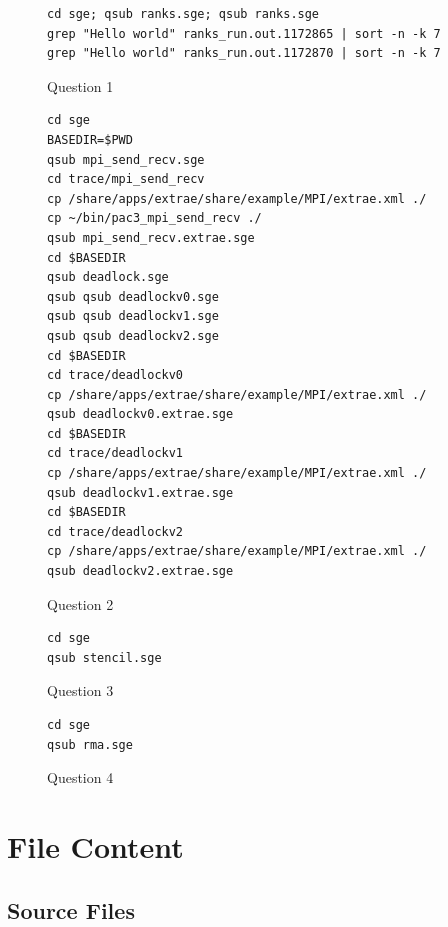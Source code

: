 \documentclass[12pt]{article}
\begin{document}
\newpage

\begin{figure}[h!]
	\begin{verbatim}
cd sge; qsub ranks.sge; qsub ranks.sge
grep "Hello world" ranks_run.out.1172865 | sort -n -k 7
grep "Hello world" ranks_run.out.1172870 | sort -n -k 7
	\end{verbatim}
\caption{Question 1}\label{code:q1}
\end{figure}

\begin{figure}[h!]
	\begin{verbatim}
cd sge
BASEDIR=$PWD
qsub mpi_send_recv.sge
cd trace/mpi_send_recv
cp /share/apps/extrae/share/example/MPI/extrae.xml ./
cp ~/bin/pac3_mpi_send_recv ./
qsub mpi_send_recv.extrae.sge
cd $BASEDIR
qsub deadlock.sge
qsub qsub deadlockv0.sge
qsub qsub deadlockv1.sge
qsub qsub deadlockv2.sge
cd $BASEDIR
cd trace/deadlockv0
cp /share/apps/extrae/share/example/MPI/extrae.xml ./
qsub deadlockv0.extrae.sge
cd $BASEDIR
cd trace/deadlockv1
cp /share/apps/extrae/share/example/MPI/extrae.xml ./
qsub deadlockv1.extrae.sge
cd $BASEDIR
cd trace/deadlockv2
cp /share/apps/extrae/share/example/MPI/extrae.xml ./
qsub deadlockv2.extrae.sge
	\end{verbatim}
\caption{Question 2}\label{code:q2}
\end{figure}

\begin{figure}[h!]
	\begin{verbatim}
cd sge
qsub stencil.sge
	\end{verbatim}
	\caption{Question 3}\label{code:q3}
\end{figure}

\newpage

\begin{figure}[h!]
	\begin{verbatim}
cd sge
qsub rma.sge
	\end{verbatim}
	\caption{Question 4}\label{code:q4}
\end{figure}

\newpage

\section*{File Content}
\subsection*{Source Files}
\end{document}

